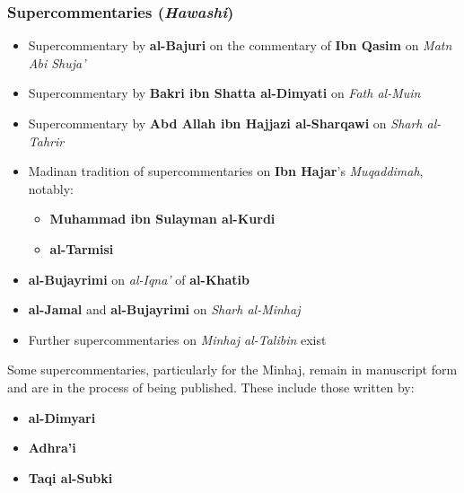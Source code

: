 \documentclass[
  a4paper,
  DIV=11,
  numbers=noendperiod]{scrartcl}
\providecommand{\tightlist}{%
  \setlength{\itemsep}{0pt}\setlength{\parskip}{0pt}}
\begin{document}
\subsubsection{\texorpdfstring{Supercommentaries
(\emph{Hawashi})}{Supercommentaries (Hawashi)}}\label{supercommentaries-hawashi}

\begin{itemize}
\tightlist
\item
  Supercommentary by \textbf{al-Bajuri} on the commentary of \textbf{Ibn
  Qasim} on \emph{Matn Abi Shuja'}
\item
  Supercommentary by \textbf{Bakri ibn Shatta al-Dimyati} on \emph{Fath
  al-Muin}
\item
  Supercommentary by \textbf{Abd Allah ibn Hajjazi al-Sharqawi} on
  \emph{Sharh al-Tahrir}
\item
  Madinan tradition of supercommentaries on \textbf{Ibn Hajar}'s
  \emph{Muqaddimah}, notably:

  \begin{itemize}
  \tightlist
  \item
    \textbf{Muhammad ibn Sulayman al-Kurdi}
  \item
    \textbf{al-Tarmisi}
  \end{itemize}
\item
  \textbf{al-Bujayrimi} on \emph{al-Iqna'} of \textbf{al-Khatib}
\item
  \textbf{al-Jamal} and \textbf{al-Bujayrimi} on \emph{Sharh al-Minhaj}
\item
  Further supercommentaries on \emph{Minhaj al-Talibin} exist
\end{itemize}

\begin{tcolorbox}[enhanced jigsaw, breakable, titlerule=0mm, toprule=.15mm, colframe=quarto-callout-note-color-frame, opacityback=0, title=\textcolor{quarto-callout-note-color}{\faInfo}\hspace{0.5em}{Unpublished Treasures}, colback=white, rightrule=.15mm, colbacktitle=quarto-callout-note-color!10!white, bottomtitle=1mm, toptitle=1mm, arc=.35mm, leftrule=.75mm, bottomrule=.15mm, coltitle=black, left=2mm, opacitybacktitle=0.6]

Some supercommentaries, particularly for the Minhaj, remain in
manuscript form and are in the process of being published. These include
those written by:

\begin{itemize}
\tightlist
\item
  \textbf{al-Dimyari}
\item
  \textbf{Adhra'i}
\item
  \textbf{Taqi al-Subki}
\end{itemize}

\end{tcolorbox}
\end{document}
